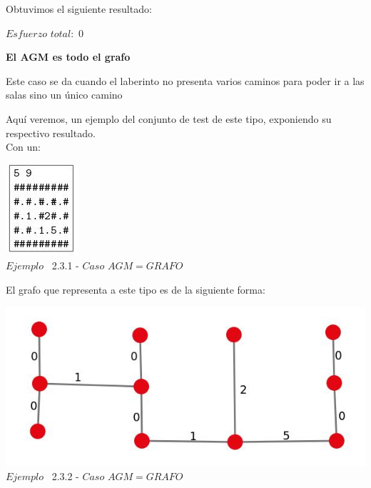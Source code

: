   Obtuvimos el siguiente resultado:

$Esfuerzo$ $total: $ $0$


\begin{center}
 \textbf{El AGM es todo el grafo}
\end{center}

Este caso se da cuando el laberinto no presenta varios caminos para poder ir a las salas sino un \'unico camino 


Aqu\'i veremos, un ejemplo del conjunto de test de este tipo, exponiendo su respectivo resultado.\\
 
 Con un:
 
\vspace*{0.3cm} \vspace*{0.3cm}
  \begin{center}
 \includegraphics[scale=0.65]{./EJ2/ej2completo.jpeg}
\\ {$Ejemplo$ \ 2.3.1 - $Caso$ $AGM = GRAFO$}
  \end{center}
  \vspace*{0.3cm}

El grafo que representa a este tipo es de la siguiente forma:\\

\vspace*{0.3cm} \vspace*{0.3cm}
  \begin{center}
 \includegraphics[scale=0.5]{./EJ2/ej2grafocompleto.jpeg}
 \\{$Ejemplo$ \ 2.3.2 - $Caso$ $AGM = GRAFO$}
  \end{center}
  \vspace*{0.3cm}


